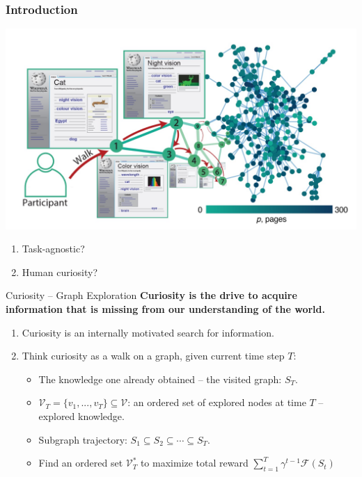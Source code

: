 \documentclass{beamer}
\begin{document}
\begin{frame}
\frametitle{Introduction}
\begin{center} \includegraphics[scale=.35]{graph.jpg}\end{center}
\begin{enumerate}
    \item Task-agnostic?
    \item Human curiosity?
\end{enumerate}
\end{frame}


\begin{frame}{Curiosity -- Graph Exploration}
\textbf{Curiosity is the drive to acquire information that is missing from our understanding of the world.} 
\begin{enumerate}
\item Curiosity is an internally motivated search for information.
\item Think curiosity as a walk on a graph, given current time step $T$:
\begin{itemize}
\item The knowledge one already obtained -- the visited graph: $S_T$.
\item $\mathcal{V}_T=\lbrace v_1,...,v_T \rbrace \subseteq \mathcal{V}$: an ordered set of explored nodes at time $T$ -- explored knowledge.
\item Subgraph trajectory: $S_1 \subseteq S_2 \subseteq \cdots \subseteq S_T$.
\item Find an ordered set $\mathcal{V}^*_T$ to maximize total reward $\sum_{t=1}^T\gamma^{t-1}\mathcal{F}(S_t)$

\end{itemize}
\end{enumerate}

\end{frame}
\end{document}
